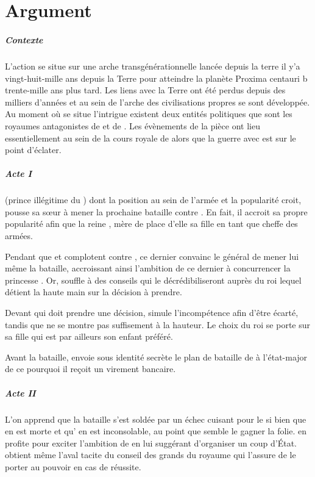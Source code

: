 \chapter{Argument}

\paragraph{Contexte}
L’action se situe sur une arche transgénérationnelle lancée depuis la terre il y’a vingt-huit-mille ans depuis la Terre pour atteindre la planète Proxima centauri b trente-mille ans plus tard. Les liens avec la Terre ont été perdus depuis des milliers d’années et au sein de l’arche des civilisations propres se sont développée. Au moment où se situe l’intrigue existent deux entités politiques que sont les royaumes antagonistes de \campprincipal{} et de \campoppose{}.
Les évènements de la pièce ont lieu essentiellement au sein de la cours royale de \campprincipal{} alors que la guerre avec \campoppose{} est sur le point d’éclater.

\paragraph{Acte I}
\elena{} (prince illégitime du \campprincipal) dont la position au sein de l’armée et la popularité croit, pousse sa sœur \princesse{} à mener la prochaine bataille contre \campoppose{}. En fait, il accroit sa propre popularité afin que la reine \reine{}, mère de \princesse{}  place d’elle sa fille en tant que cheffe des armées.

Pendant que \reine{} et \princesse{} complotent contre \elena{},
ce dernier convainc le général \general{} de mener lui même la bataille, accroissant ainsi l’ambition de ce dernier à concurrencer la princesse \princesse{}. Or, \elena{} souffle à \general{} des conseils qui le décrédibiliseront auprès du roi \roi{} lequel détient la haute main sur la décision à prendre.

Devant \roi{} qui doit prendre une décision, \elena{} simule l’incompétence afin d’être écarté, tandis que \general{} ne se montre pas suffisement à la hauteur. Le choix du roi se porte sur sa fille \princesse{} qui est par ailleurs son enfant préféré.

Avant la bataille, \elena{} envoie sous identité secrète le plan de bataille de \princesse{} à l’état-major de \campoppose{} ce pourquoi il reçoit un virement bancaire.

\paragraph{Acte II}
L’on apprend que la bataille s’est soldée par un échec cuisant pour le \campprincipal{} si bien que \princesse{} en est morte et qu’\roi{} en est inconsolable, au point que semble le gagner la folie. \elena{} en profite pour exciter l’ambition de \general{} en lui suggérant d’organiser un coup d’État. \general{} obtient même l’aval tacite du conseil des grands du royaume qui l’assure de le porter au pouvoir en cas de réussite.

